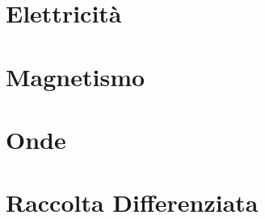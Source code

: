 \documentclass[a4paper, 11pt, twoside, openright, italian]{memoir}
\begin{document}
\frontmatter




\mainmatter
\part{Elettricità}






\part{Magnetismo}






\part{Onde}

\appendix
\part{Raccolta Differenziata}

%




\backmatter

\end{document}
